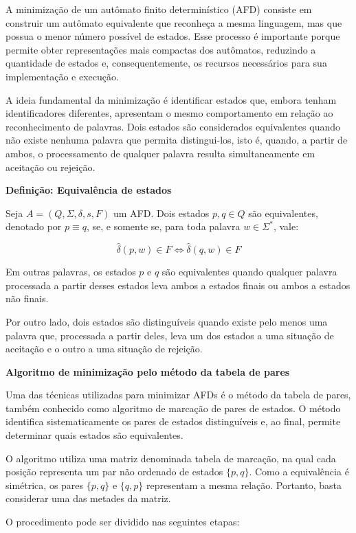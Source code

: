 \documentclass[
  brazilian,
  letterpaper,
]{book}
\theoremstyle{plain}
\theoremstyle{definition}
\theoremstyle{remark}
\begin{document}
A minimização de um autômato finito determinístico (AFD) consiste em
construir um autômato equivalente que reconheça a mesma linguagem, mas
que possua o menor número possível de estados. Esse processo é
importante porque permite obter representações mais compactas dos
autômatos, reduzindo a quantidade de estados e, consequentemente, os
recursos necessários para sua implementação e execução.

A ideia fundamental da minimização é identificar estados que, embora
tenham identificadores diferentes, apresentam o mesmo comportamento em
relação ao reconhecimento de palavras. Dois estados são considerados
equivalentes quando não existe nenhuma palavra que permita
distingui-los, isto é, quando, a partir de ambos, o processamento de
qualquer palavra resulta simultaneamente em aceitação ou rejeição.

\textbf{Definição: Equivalência de estados}

Seja \(A = (Q, \Sigma, \delta, s, F)\) um AFD. Dois estados
\(p,q \in Q\) são equivalentes, denotado por \(p \equiv q\), se, e
somente se, para toda palavra \(w \in \Sigma^*\), vale:

\[
\hat{\delta}(p,w) \in F \iff \hat{\delta}(q,w) \in F
\]

Em outras palavras, os estados \(p\) e \(q\) são equivalentes quando
qualquer palavra processada a partir desses estados leva ambos a estados
finais ou ambos a estados não finais.

Por outro lado, dois estados são distinguíveis quando existe pelo menos
uma palavra que, processada a partir deles, leva um dos estados a uma
situação de aceitação e o outro a uma situação de rejeição.

\textbf{Algoritmo de minimização pelo método da tabela de pares}

Uma das técnicas utilizadas para minimizar AFDs é o método da tabela de
pares, também conhecido como algoritmo de marcação de pares de estados.
O método identifica sistematicamente os pares de estados distinguíveis
e, ao final, permite determinar quais estados são equivalentes.

O algoritmo utiliza uma matriz denominada tabela de marcação, na qual
cada posição representa um par não ordenado de estados \(\{p,q\}\). Como
a equivalência é simétrica, os pares \(\{p,q\}\) e \(\{q,p\}\)
representam a mesma relação. Portanto, basta considerar uma das metades
da matriz.

O procedimento pode ser dividido nas seguintes etapas:
\end{document}

